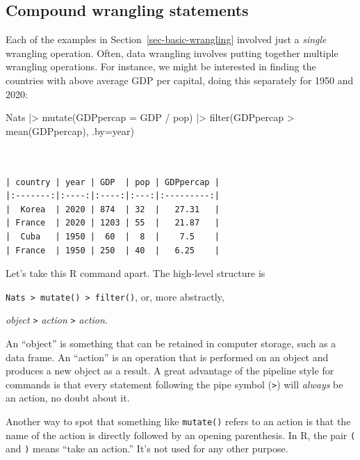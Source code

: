 \documentclass[
  letterpaper,
  DIV=11,
  numbers=noendperiod,
  oneside]{scrartcl}
\newenvironment{Shaded}{\begin{snugshade}}{\end{snugshade}}
\newcommand{\AttributeTok}[1]{\textcolor[rgb]{0.40,0.45,0.13}{#1}}
\newcommand{\FunctionTok}[1]{\textcolor[rgb]{0.28,0.35,0.67}{#1}}
\newcommand{\NormalTok}[1]{\textcolor[rgb]{0.00,0.23,0.31}{#1}}
\newcommand{\SpecialCharTok}[1]{\textcolor[rgb]{0.37,0.37,0.37}{#1}}
\begin{document}
\subsection{Compound wrangling
statements}\label{compound-wrangling-statements}

Each of the examples in Section~\ref{sec-basic-wrangling} involved just
a \emph{single} wrangling operation. Often, data wrangling involves
putting together multiple wrangling operations. For instance, we might
be interested in finding the countries with above average GDP per
capital, doing this separately for 1950 and 2020:

\begin{Shaded}
\begin{Highlighting}[]
\NormalTok{Nats }\SpecialCharTok{|\textgreater{}}
  \FunctionTok{mutate}\NormalTok{(}\AttributeTok{GDPpercap =}\NormalTok{ GDP }\SpecialCharTok{/}\NormalTok{ pop) }\SpecialCharTok{|\textgreater{}}
  \FunctionTok{filter}\NormalTok{(GDPpercap }\SpecialCharTok{\textgreater{}} \FunctionTok{mean}\NormalTok{(GDPpercap), }\AttributeTok{.by=}\NormalTok{year) }
\end{Highlighting}
\end{Shaded}

\begin{verbatim}


| country | year | GDP  | pop | GDPpercap |
|:-------:|:----:|:----:|:---:|:---------:|
|  Korea  | 2020 | 874  | 32  |   27.31   |
| France  | 2020 | 1203 | 55  |   21.87   |
|  Cuba   | 1950 |  60  |  8  |    7.5    |
| France  | 1950 | 250  | 40  |   6.25    |
\end{verbatim}

Let's take this R command apart. The high-level structure is

\texttt{Nats\ \textbar{}\textgreater{}\ mutate()\ \textbar{}\textgreater{}\ filter()},
or, more abstractly,

\emph{object} \texttt{\textbar{}\textgreater{}} \emph{action}
\texttt{\textbar{}\textgreater{}} \emph{action}.

An ``object'' is something that can be retained in computer storage,
such as a data frame. An ``action'' is an operation that is performed on
an object and produces a new object as a result. A great advantage of
the pipeline style for commands is that every statement following the
pipe symbol (\texttt{\textbar{}\textgreater{}}) will \emph{always} be an
action, no doubt about it.

Another way to spot that something like \texttt{mutate()} refers to an
action is that the name of the action is directly followed by an opening
parenthesis. In R, the pair \texttt{(} and \texttt{)} means ``take an
action.'' It's not used for any other purpose.
\end{document}
